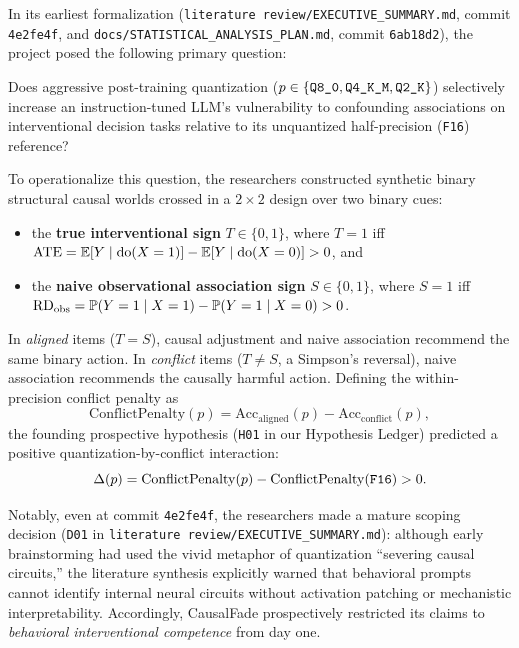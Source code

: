 In its earliest formalization (\texttt{literature review/EXECUTIVE\_SUMMARY.md}, commit \texttt{4e2fe4f}, and \texttt{docs/STATISTICAL\_ANALYSIS\_PLAN.md}, commit \texttt{6ab18d2}), the project posed the following primary question:

\begin{definition}
Does aggressive post-training quantization ($p \in \{\text{\texttt{Q8\_0}}, \text{\texttt{Q4\_K\_M}}, \text{\texttt{Q2\_K}}\}$) selectively increase an instruction-tuned LLM's vulnerability to confounding associations on interventional decision tasks relative to its unquantized half-precision (\texttt{F16}) reference?
\end{definition}

To operationalize this question, the researchers constructed synthetic binary structural causal worlds crossed in a $2\times 2$ design over two binary cues:
\begin{itemize}
  \item the \textbf{true interventional sign} $T \in \{0,1\}$, where $T=1$ iff $\mathrm{ATE} = \mathbb{E}[Y\mid \operatorname{do}(X=1)] - \mathbb{E}[Y\mid \operatorname{do}(X=0)] > 0$, and
  \item the \textbf{naive observational association sign} $S \in \{0,1\}$, where $S=1$ iff $\mathrm{RD}_{\mathrm{obs}} = \mathbb{P}(Y=1\mid X=1) - \mathbb{P}(Y=1\mid X=0) > 0$.
\end{itemize}
In \emph{aligned} items ($T = S$), causal adjustment and naive association recommend the same binary action. In \emph{conflict} items ($T \neq S$, a Simpson's reversal), naive association recommends the causally harmful action. Defining the within-precision conflict penalty as
\begin{equation}
  \mathrm{ConflictPenalty}(p) = \mathrm{Acc}_{\mathrm{aligned}}(p) - \mathrm{Acc}_{\mathrm{conflict}}(p),
\end{equation}
the founding prospective hypothesis (\texttt{H01} in our Hypothesis Ledger) predicted a positive quantization-by-conflict interaction:
\begin{equation}
  \Delta(p) = \mathrm{ConflictPenalty}(p) - \mathrm{ConflictPenalty}(\text{\texttt{F16}}) > 0.
  \label{eq:origin_delta}
\end{equation}

Notably, even at commit \texttt{4e2fe4f}, the researchers made a mature scoping decision (\texttt{D01} in \texttt{literature review/EXECUTIVE\_SUMMARY.md}): although early brainstorming had used the vivid metaphor of quantization ``severing causal circuits,'' the literature synthesis explicitly warned that behavioral prompts cannot identify internal neural circuits without activation patching or mechanistic interpretability. Accordingly, CausalFade prospectively restricted its claims to \emph{behavioral interventional competence} from day one.

